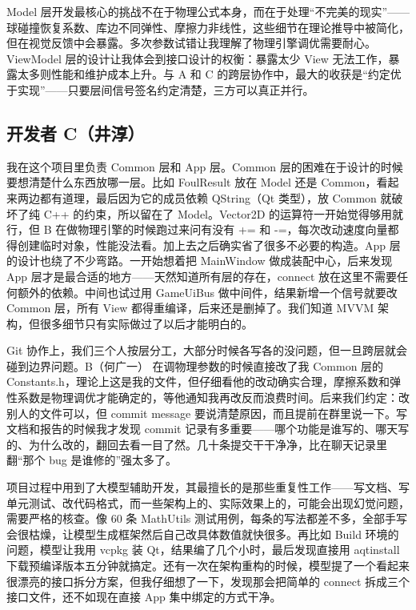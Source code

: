 \documentclass[11pt]{ctexart}
\begin{document}
Model 层开发最核心的挑战不在于物理公式本身，而在于处理“不完美的现实”——球碰撞恢复系数、库边不同弹性、摩擦力非线性，这些细节在理论推导中被简化，但在视觉反馈中会暴露。多次参数试错让我理解了物理引擎调优需要耐心。ViewModel 层的设计让我体会到接口设计的权衡：暴露太少 View 无法工作，暴露太多则性能和维护成本上升。与 A 和 C 的跨层协作中，最大的收获是“约定优于实现”——只要层间信号签名约定清楚，三方可以真正并行。

\subsection{开发者 C（井淳）}

我在这个项目里负责 Common 层和 App 层。Common 层的困难在于设计的时候要想清楚什么东西放哪一层。比如 FoulResult 放在 Model 还是 Common，看起来两边都有道理，最后因为它的成员依赖 QString（Qt 类型），放 Common 就破坏了纯 C++ 的约束，所以留在了 Model。Vector2D 的运算符一开始觉得够用就行，但 B 在做物理引擎的时候跑过来问有没有 += 和 -=，每次改动速度向量都得创建临时对象，性能没法看。加上去之后确实省了很多不必要的构造。App 层的设计也绕了不少弯路。一开始想着把 MainWindow 做成装配中心，后来发现 App 层才是最合适的地方——天然知道所有层的存在，connect 放在这里不需要任何额外的依赖。中间也试过用 GameUiBus 做中间件，结果新增一个信号就要改 Common 层，所有 View 都得重编译，后来还是删掉了。我们知道 MVVM 架构，但很多细节只有实际做过了以后才能明白的。

Git 协作上，我们三个人按层分工，大部分时候各写各的没问题，但一旦跨层就会碰到边界问题。B（何广一） 在调物理参数的时候直接改了我 Common 层的 Constants.h，理论上这是我的文件，但仔细看他的改动确实合理，摩擦系数和弹性系数是物理调优才能确定的，等他通知我再改反而浪费时间。后来我们约定：改别人的文件可以，但 commit message 要说清楚原因，而且提前在群里说一下。写文档和报告的时候我才发现 commit 记录有多重要——哪个功能是谁写的、哪天写的、为什么改的，翻回去看一目了然。几十条提交干干净净，比在聊天记录里翻“那个 bug 是谁修的”强太多了。

项目过程中用到了大模型辅助开发，其最擅长的是那些重复性工作——写文档、写单元测试、改代码格式，而一些架构上的、实际效果上的，可能会出现幻觉问题，需要严格的核查。像 60 条 MathUtils 测试用例，每条的写法都差不多，全部手写会很枯燥，让模型生成框架然后自己改具体数值就快很多。再比如 Build 环境的问题，模型让我用 vcpkg 装 Qt，结果编了几个小时，最后发现直接用 aqtinstall 下载预编译版本五分钟就搞定。还有一次在架构重构的时候，模型提了一个看起来很漂亮的接口拆分方案，但我仔细想了一下，发现那会把简单的 connect 拆成三个接口文件，还不如现在直接 App 集中绑定的方式干净。
\end{document}

